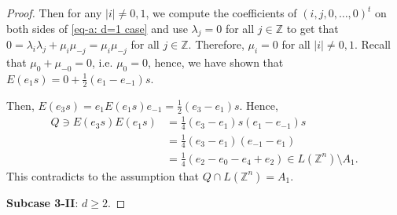 \documentclass[12pt]{amsart}
\theoremstyle{definition}
\theoremstyle{remark}
\begin{document}
\begin{proof}
Then for any $|i|\neq 0, 1$, we compute the coefficients of $(i,j,0,\ldots, 0)^t$ on both sides of
\eqref{eq-a: d=1 case} and use $\lambda_j=0$ for all $j\in\mathbb{Z}$ to get that
$0=\lambda_i\lambda_j+\mu_i\mu_{-j}=\mu_i\mu_{-j}$ for all $j\in\mathbb{Z}$. Therefore, $\mu_i=0$ for all $|i|\neq 0, 1$. Recall that $\mu_0+\mu_{-0}=0$, i.e. $\mu_0=0$, hence, we have shown that
$E(e_1s)=0+\frac{1}{2}(e_{1}-e_{-1})s$.

Then, $E(e_{3}s)=e_{1}E(e_1s)e_{-1}=\frac{1}{2}(e_{3}-e_{1})s$.
Hence, 
\begin{align*}
Q\ni E(e_{3}s)E(e_1s)&=\frac{1}{4}(e_{3}-e_{1})s(e_{1}-e_{-1})s\\
&=\frac{1}{4}(e_{3}-e_{1})(e_{-1}-e_{1})\\
&=\frac{1}{4}(e_{2}-e_{0}-e_{4}+e_{2})\in L(\mathbb{Z}^n)\setminus A_1.
\end{align*}
This contradicts to the assumption that $Q\cap L(\mathbb{Z}^n)=A_1$.
















\textbf{Subcase 3-II}: $d\geq 2$.


\end{proof}
\end{document}
